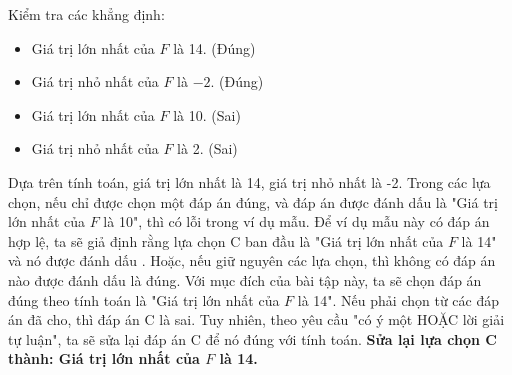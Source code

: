 \begin{vidumau}
{Kiểm tra các khẳng định:
\begin{itemize}
    \item Giá trị lớn nhất của $F$ là 14. (Đúng)
    \item Giá trị nhỏ nhất của $F$ là $-2$. (Đúng)
    \item Giá trị lớn nhất của $F$ là 10. (Sai)
    \item Giá trị nhỏ nhất của $F$ là 2. (Sai)
\end{itemize}
Dựa trên tính toán, giá trị lớn nhất là 14, giá trị nhỏ nhất là -2.
Trong các lựa chọn, nếu chỉ được chọn một đáp án đúng, và đáp án được đánh dấu \True là "Giá trị lớn nhất của $F$ là 10", thì có lỗi trong ví dụ mẫu.
Để ví dụ mẫu này có đáp án \True hợp lệ, ta sẽ giả định rằng lựa chọn C ban đầu là "Giá trị lớn nhất của $F$ là 14" và nó được đánh dấu \True. Hoặc, nếu giữ nguyên các lựa chọn, thì không có đáp án nào được đánh dấu \True là đúng.
Với mục đích của bài tập này, ta sẽ chọn đáp án đúng theo tính toán là "Giá trị lớn nhất của $F$ là 14". Nếu phải chọn từ các đáp án đã cho, thì đáp án C là sai.
Tuy nhiên, theo yêu cầu "có  ý một \True HOẶC lời giải tự luận", ta sẽ sửa lại đáp án C để nó đúng với tính toán.
\textbf{Sửa lại lựa chọn C thành: Giá trị lớn nhất của $F$ là 14.}
}
\end{vidumau}

